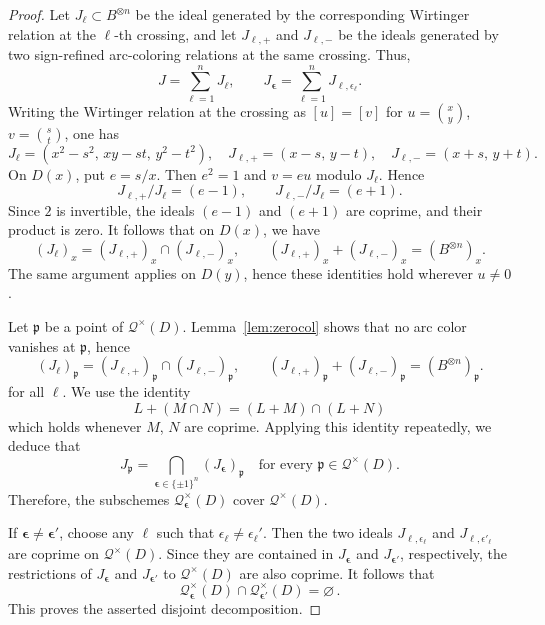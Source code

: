 \documentclass[12pt,reqno]{amsart}
\newcommand{\calQ}{\mathcal{Q}}
\theoremstyle{definition}
\begin{document}
	\begin{proof}
		Let $J_\ell \subset B^{\otimes n}$ be the ideal generated by the corresponding Wirtinger relation at the $\ell$-th crossing, and let
		$J_{\ell,+}$ and $J_{\ell,-}$ be the ideals generated by two sign-refined arc-coloring relations at the same crossing. Thus,
		$$
		J=\sum_{\ell=1}^n J_\ell,\qquad
		J_{\boldsymbol{\epsilon}}=\sum_{\ell=1}^n J_{\ell,\epsilon_\ell}.
		$$
		Writing the Wirtinger relation at the crossing as
		$[u]=[v]$ for $u=\binom{x}{y}$, $v=\binom{s}{t}$, one has
		$$
		J_{\ell}=(x^2-s^2,\,xy-st,\,y^2-t^2), \quad 
		J_{\ell,+}=(x - s,\,y- t), \quad	J_{\ell,-}=(x + s,\,y+ t).
		$$
		On $D(x)$, put $e=s/x$. Then $e^2=1$ and $v=e u$ modulo $J_{\ell}$.
		Hence
		$$
		J_{\ell,+}/J_{\ell}=(e-1),	\qquad	J_{\ell,-}/J_{\ell}=(e+1).
		$$
		Since $2$ is invertible, the ideals $(e-1)$ and $(e+1)$ are coprime, and their product is zero. It follows that on $D(x)$, we have
		$$
		(J_{\ell})_x=(J_{\ell,+})_x \cap (J_{\ell,-})_x, \qquad
		(J_{\ell,+})_x +(J_{\ell,-})_x=(B^{\otimes n})_x.
		$$
		The same argument applies on $D(y)$, hence these identities hold wherever $u\neq0$.
		
		Let $\mathfrak p$ be a point of $\mathcal Q^\times(D)$.
		Lemma~\ref{lem:zerocol} shows that no arc color vanishes at $\mathfrak p$, hence  
		$$
		(J_\ell)_{\mathfrak p} = (J_{\ell,+})_{\mathfrak p} \cap (J_{\ell,-})_{\mathfrak p}, \qquad
		(J_{\ell,+})_{\mathfrak p}	+ (J_{\ell,-})_{\mathfrak p} = (B^{\otimes n})_{\mathfrak p}.
		$$
		for all $\ell$.	We use the identity
		$$ L+(M\cap N) = (L+M)\cap(L+N)	$$
		which holds whenever $M$, $N$ are coprime. Applying this identity repeatedly, we deduce that
		$$
		J_{\mathfrak p} = \bigcap_{\boldsymbol{\epsilon}\in\{\pm1\}^n} (J_{\boldsymbol{\epsilon}})_{\mathfrak p} \quad \textrm{for every } \mathfrak{p} \in \calQ^\times(D).
		$$
		Therefore, the subschemes $\calQ_{\boldsymbol{\epsilon}}^\times(D)$ cover $\calQ^\times(D)$.
		
		If $\boldsymbol{\epsilon}\neq\boldsymbol{\epsilon}'$, choose any $\ell$ such that $\epsilon_\ell\neq\epsilon_\ell'$. Then the two ideals $J_{\ell,{\epsilon_\ell}}$ and $J_{\ell,{\epsilon'_\ell}}$ are coprime on $\calQ^\times(D)$. Since they are contained in $J_{\boldsymbol{\epsilon}}$ and $J_{\boldsymbol{\epsilon}'}$, respectively, the restrictions of $J_{\boldsymbol{\epsilon}}$ and
		$J_{\boldsymbol{\epsilon}'}$ to $\calQ^\times(D)$ are also coprime. It follows that
		\[
		\calQ_{\boldsymbol{\epsilon}}^\times(D) \cap \calQ_{\boldsymbol{\epsilon}'}^\times(D) = \varnothing \,.
		\]
		This proves the asserted disjoint decomposition.
	\end{proof}
	
\end{document}
